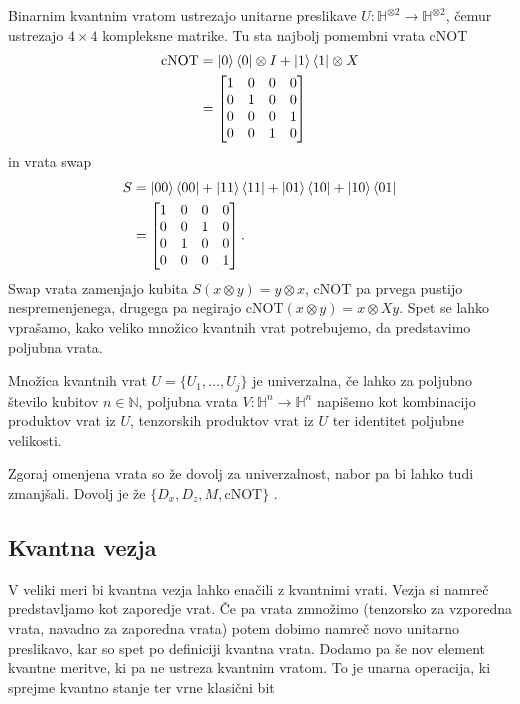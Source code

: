 \documentclass[mat1]{fmfdelo}
\newcommand{\N}{\mathbb N}
\newcommand{\Hb}{\mathbb H}
\begin{document}
Binarnim kvantnim vratom ustrezajo unitarne preslikave \(U:\Hb^{\otimes 2}\to \Hb^{\otimes 2}\), čemur ustrezajo \(4\times 4\) kompleksne matrike. Tu sta najbolj pomembni vrata cNOT 
\begin{align*}
    \text{cNOT}&=\ket0\bra0\otimes I + \ket1\bra1\otimes X \\
    &=\begin{bmatrix}
        1&0&0&0\\
        0&1&0&0\\
        0&0&0&1\\
        0&0&1&0
    \end{bmatrix}
\end{align*}
in vrata swap
\begin{align*}
    S &= \ket{00}\bra{00}+\ket{11}\bra{11}+\ket{01}\bra{10}+\ket{10}\bra{01}\\
    &=\begin{bmatrix}
        1&0&0&0\\
        0&0&1&0\\
        0&1&0&0\\
        0&0&0&1
    \end{bmatrix}.
\end{align*}
Swap vrata zamenjajo kubita \(S(x\otimes y)=y\otimes x\), cNOT pa prvega pustijo nespremenjenega, drugega pa negirajo cNOT\((x\otimes y)=x\otimes Xy\). Spet se lahko vprašamo, kako veliko množico kvantnih vrat potrebujemo, da predstavimo poljubna vrata.
\begin{definicija}
    Množica kvantnih vrat \(U=\{U_1,\ldots,U_j\}\) je univerzalna, če lahko za poljubno število kubitov \(n\in\N\), poljubna vrata \(V:\Hb^n\to \Hb^n\) napišemo kot kombinacijo produktov vrat iz \(U\), tenzorskih produktov vrat iz \(U\) ter identitet poljubne velikosti.
\end{definicija}
Zgoraj omenjena vrata so že dovolj za univerzalnost, nabor pa bi lahko tudi zmanjšali. Dovolj je že \(\{D_x,D_z, M, \)cNOT\(\}\) \cite[Lema 5.26]{mathforqm}.
\subsection{Kvantna vezja}
V veliki meri bi kvantna vezja lahko enačili z kvantnimi vrati. Vezja si namreč predstavljamo kot zaporedje vrat. Če pa vrata zmnožimo (tenzorsko za vzporedna vrata, navadno za zaporedna vrata) potem dobimo namreč novo unitarno preslikavo, kar so spet po definiciji kvantna vrata. Dodamo pa še nov element kvantne meritve, ki pa ne ustreza kvantnim vratom. To je unarna operacija, ki sprejme kvantno stanje ter vrne klasični bit
\end{document}
